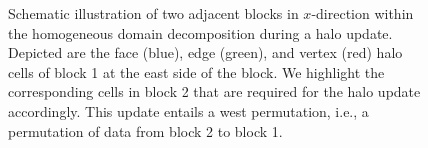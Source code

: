 \documentclass{article}
\begin{document}
\begin{figure}[h]
    \caption{Schematic illustration of two adjacent blocks in $x$-direction within the homogeneous domain decomposition during a halo update. Depicted are the face (blue), edge (green), and vertex (red) halo cells of block 1 at the east side of the block. We highlight the corresponding cells in block 2 that are required for the halo update accordingly. This update entails a west permutation, i.e., a permutation of data from block 2 to block 1.}
    \label{fig:block_halo_update}
\end{figure}
\end{document}
